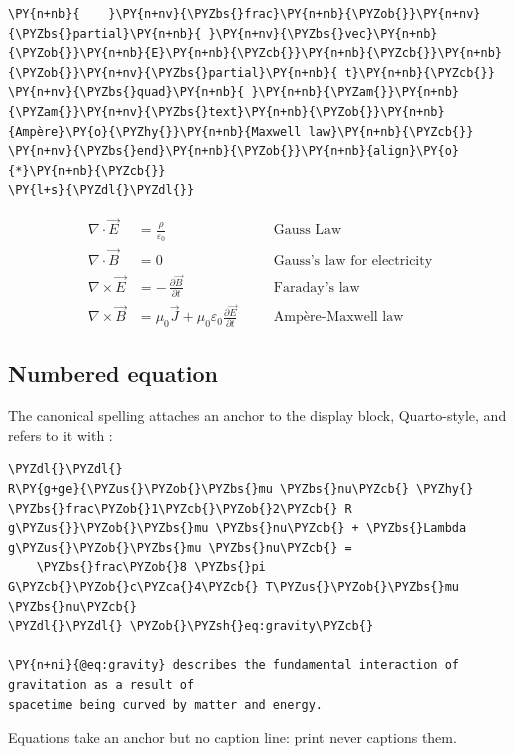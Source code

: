\documentclass[a4paper,twoside]{article}
\begin{document}
\begin{tscode}[lang=latex, engine=pygments]
\begin{Verbatim}[commandchars=\\\{\},breaklines, breakanywhere, commandchars=\\\{\}]
\PY{n+nb}{    }\PY{n+nv}{\PYZbs{}frac}\PY{n+nb}{\PYZob{}}\PY{n+nv}{\PYZbs{}partial}\PY{n+nb}{ }\PY{n+nv}{\PYZbs{}vec}\PY{n+nb}{\PYZob{}}\PY{n+nb}{E}\PY{n+nb}{\PYZcb{}}\PY{n+nb}{\PYZcb{}}\PY{n+nb}{\PYZob{}}\PY{n+nv}{\PYZbs{}partial}\PY{n+nb}{ t}\PY{n+nb}{\PYZcb{}}
\PY{n+nv}{\PYZbs{}quad}\PY{n+nb}{ }\PY{n+nb}{\PYZam{}}\PY{n+nb}{\PYZam{}}\PY{n+nv}{\PYZbs{}text}\PY{n+nb}{\PYZob{}}\PY{n+nb}{Ampère}\PY{o}{\PYZhy{}}\PY{n+nb}{Maxwell law}\PY{n+nb}{\PYZcb{}}
\PY{n+nv}{\PYZbs{}end}\PY{n+nb}{\PYZob{}}\PY{n+nb}{align}\PY{o}{*}\PY{n+nb}{\PYZcb{}}
\PY{l+s}{\PYZdl{}\PYZdl{}}
\end{Verbatim}
\end{tscode}
\begin{align*}
\nabla \cdot \vec{E} &= \frac{\rho}{\varepsilon_0} \quad &&\text{Gauss Law}\\[4pt]
\nabla \cdot \vec{B} &= 0 \quad &&\text{Gauss's law for electricity}\\[4pt]
\nabla \times \vec{E} &= -\,\frac{\partial \vec{B}}{\partial t}
\quad &&\text{Faraday's law}\\[4pt]
\nabla \times \vec{B} &= \mu_0 \vec{J} + \mu_0 \varepsilon_0
\frac{\partial \vec{E}}{\partial t}
\quad &&\text{Ampère-Maxwell law}
\end{align*}
\subsection{Numbered equation}
The canonical spelling attaches an anchor to the display block, Quarto-style,
and refers to it with :
\begin{tscode}[lang=md, engine=pygments]
\begin{Verbatim}[commandchars=\\\{\},breaklines, breakanywhere, commandchars=\\\{\}]
\PYZdl{}\PYZdl{}
R\PY{g+ge}{\PYZus{}\PYZob{}\PYZbs{}mu \PYZbs{}nu\PYZcb{} \PYZhy{} \PYZbs{}frac\PYZob{}1\PYZcb{}\PYZob{}2\PYZcb{} R g\PYZus{}}\PYZob{}\PYZbs{}mu \PYZbs{}nu\PYZcb{} + \PYZbs{}Lambda g\PYZus{}\PYZob{}\PYZbs{}mu \PYZbs{}nu\PYZcb{} =
    \PYZbs{}frac\PYZob{}8 \PYZbs{}pi G\PYZcb{}\PYZob{}c\PYZca{}4\PYZcb{} T\PYZus{}\PYZob{}\PYZbs{}mu \PYZbs{}nu\PYZcb{}
\PYZdl{}\PYZdl{} \PYZob{}\PYZsh{}eq:gravity\PYZcb{}

\PY{n+ni}{@eq:gravity} describes the fundamental interaction of gravitation as a result of
spacetime being curved by matter and energy.
\end{Verbatim}
\end{tscode}
Equations take an anchor but no caption line: print never captions them.
\end{document}
